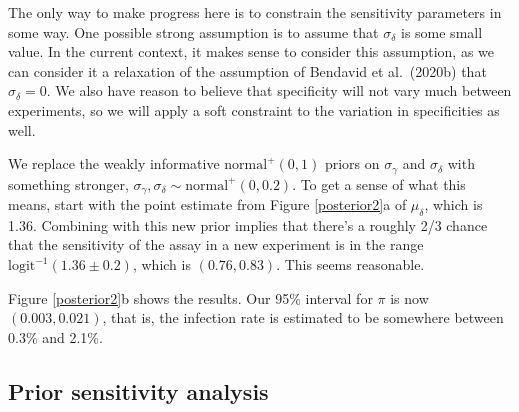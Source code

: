 \documentclass[11pt]{article}
\begin{document}
The only way to make progress here is to constrain the sensitivity parameters in some way.  One possible strong assumption is to assume that $\sigma_{\delta}$ is some small value. In the current context, it makes sense to consider this assumption, as we can consider it a relaxation of the assumption of Bendavid et al.\ (2020b) that $\sigma_{\delta} = 0$.  We also have reason to believe that specificity will not vary much between experiments, so we will apply a soft constraint to the variation in specificities as well.

We replace the weakly informative $\mbox{normal}^+(0, 1)$ priors on $\sigma_{\gamma}$ and $\sigma_{\delta}$ with something stronger,
$\sigma_{\gamma}, \sigma_{\delta}\sim\mbox{normal}^+(0, 0.2)$.  To get a sense of what this means, start with the point estimate from Figure \ref{posterior2}a of $\mu_{\delta}$, which is 1.36. Combining with this new prior implies that there's a roughly 2/3 chance that the sensitivity of the assay in a new experiment is in the range $\mbox{logit}^{-1}(1.36 \pm 0.2)$, which is $(0.76, 0.83)$. This seems reasonable.

Figure \ref{posterior2}b shows the results.  Our 95\% interval for $\pi$ is now $(0.003, 0.021)$, that is, the infection rate is estimated to be somewhere between 0.3\% and 2.1\%.

\subsection{Prior sensitivity analysis}
\end{document}
